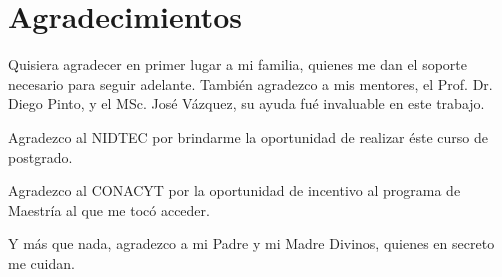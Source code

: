 \chapter*{Agradecimientos}

Quisiera agradecer en primer lugar a mi familia, quienes me dan el soporte necesario para seguir adelante. También agradezco a mis mentores, el Prof. Dr. Diego Pinto, y el MSc. José Vázquez, su ayuda fué invaluable en este trabajo.

Agradezco al NIDTEC por brindarme la oportunidad de realizar éste curso de postgrado.

Agradezco al CONACYT por la oportunidad de incentivo al programa de Maestría al que me tocó acceder.

Y más que nada, agradezco a mi Padre y mi Madre Divinos, quienes en secreto me cuidan.

